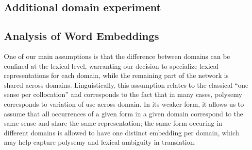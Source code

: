 \documentclass[a4paper]{article}
\begin{document}
\begin{table}[!h]
\begin{center}
\end{center}
\caption{BPE-detokenized BLEU scores for the Transformer architecture for varying domain-specific embedding sizes \label{tab:embedding-size}}
\end{table}

\subsection{Additional domain experiment \label{ssec:additiona_domain}}


\subsection{Analysis of Word Embeddings \label{ssec:word_embeddings}}
One of our main assumptions is that the difference between domains can be confined at the lexical level, warranting our decision to specialize lexical representations for each domain, while the remaining part of the network is shared across domains. Linguistically, this assumption relates to the classical ``one sense per collocation'' \cite{Yarowsky93onesense} and corresponds to the fact that in many cases, polysemy corresponds to variation of use across domain. In its weaker form, it allows us to assume that all occurrences of a given form in a given domain correspond to the same sense and share the same representation; the same form occuring in different domains is allowed to have one distinct embedding per domain, which may help capture polysemy and lexical ambiguity in translation. 
\end{document}
